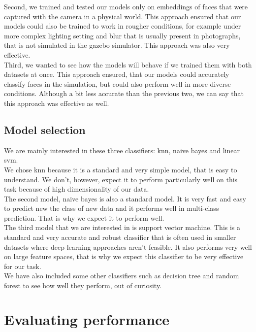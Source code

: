 \documentclass[12pt,a4paper]{article}
\begin{document}
    Second, we trained and tested our models only on embeddings of faces that were captured with the camera in a physical world. This approach ensured that our models could also be trained to work in rougher conditions, for example under more complex lighting setting and blur that is usually present in photographs, that is not simulated in the gazebo simulator. This approach was also very effective. \\

    Third, we wanted to see how the models will behave if we trained them with both datasets at once. This approach ensured, that our models could accurately classify faces in the simulation, but could also perform well in more diverse conditions. Although a bit less accurate than the previous two, we can say that this approach was effective as well. \\

    \subsection{Model selection}

    We are mainly interested in these three classifiers: knn, naive bayes and linear svm. \\

    We chose knn because it is a standard and very simple model, that is easy to understand. We don't, however, expect it to perform particularly well on this task because of high dimensionality of our data. \\

    The second model, naive bayes is also a standard model. It is very fast and easy to predict new the class of new data and it performs well in multi-class prediction. That is why we expect it to perform well. \\

    The third model that we are interested in is support vector machine. This is a standard and very accurate and robust classifier that is often used in smaller datasets where deep learning approaches aren't feasible. It also performs very well on large feature spaces, that is why we expect this classifier to be very effective for our task. \\

    We have also included some other classifiers such as decision tree and random forest to see how well they perform, out of curiosity. 

    \section{Evaluating performance}
\end{document}
